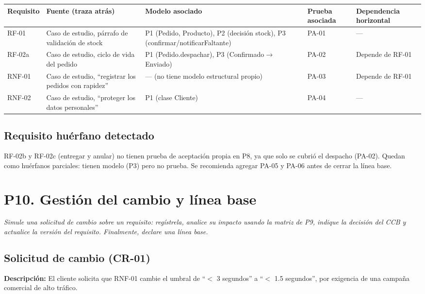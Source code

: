 \documentclass[11pt]{article}
\begin{document}
\begin{center}
\small
\begin{tabular}{|p{1.4cm}|p{3cm}|p{3.7cm}|p{1.7cm}|p{2.3cm}|}
\hline
\textbf{Requisito} & \textbf{Fuente (traza atrás)} & \textbf{Modelo asociado} & \textbf{Prueba asociada} & \textbf{Dependencia horizontal} \\
\hline
RF-01 & Caso de estudio, párrafo de validación de stock & P1 (Pedido, Producto), P2 (decisión stock), P3 (confirmar/notificarFaltante) & PA-01 & --- \\
\hline
RF-02a & Caso de estudio, ciclo de vida del pedido & P1 (Pedido.despachar), P3 (Confirmado$\to$Enviado) & PA-02 & Depende de RF-01 \\
\hline
RNF-01 & Caso de estudio, ``registrar los pedidos con rapidez'' & --- (no tiene modelo estructural propio) & PA-03 & Depende de RF-01 \\
\hline
RNF-02 & Caso de estudio, ``proteger los datos personales'' & P1 (clase Cliente) & PA-04 & --- \\
\hline
\end{tabular}
\end{center}

\subsection*{Requisito huérfano detectado}
RF-02b y RF-02c (entregar y anular) no tienen prueba de aceptación propia en P8, ya que solo se cubrió el despacho (PA-02). Quedan como huérfanos parciales: tienen modelo (P3) pero no prueba. Se recomienda agregar PA-05 y PA-06 antes de cerrar la línea base.

\newpage

\section*{P10. Gestión del cambio y línea base}

\textit{Simule una solicitud de cambio sobre un requisito: regístrela, analice su impacto usando la matriz de P9, indique la decisión del CCB y actualice la versión del requisito. Finalmente, declare una línea base.}

\subsection*{Solicitud de cambio (CR-01)}
\textbf{Descripción:} El cliente solicita que RNF-01 cambie el umbral de ``$<$ 3 segundos'' a ``$<$ 1.5 segundos'', por exigencia de una campaña comercial de alto tráfico.
\end{document}

